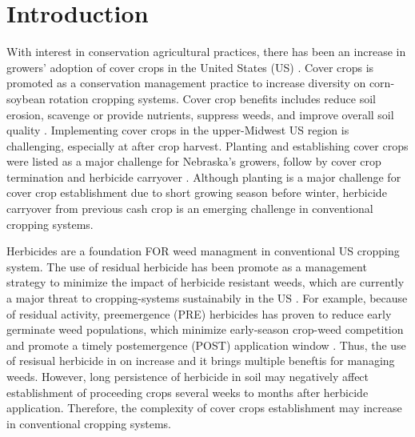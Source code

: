 \documentclass[agriculture,article,submit,moreauthors,pdftex]{mdpi}
\begin{document}

\hypertarget{introduction}{%
\section{Introduction}\label{introduction}}

With interest in conservation agricultural practices, there has been an
increase in growers' adoption of cover crops in the United States (US)
\citep{oliveira_assessment_2019}. Cover crops is promoted as a
conservation management practice to increase diversity on corn-soybean
rotation cropping systems. Cover crop benefits includes reduce soil
erosion, scavenge or provide nutrients, suppress weeds, and improve
overall soil quality
\citep{blanco-canqui_cover_2015, hartwig_cover_2002, snapp_evaluating_2005}.
Implementing cover crops in the upper-Midwest US region is challenging,
especially at after crop harvest. Planting and establishing cover crops
were listed as a major challenge for Nebraska's growers, follow by cover
crop termination and herbicide carryover
\citep{oliveira_assessment_2019}. Although planting is a major challenge
for cover crop establishment due to short growing season before winter,
herbicide carryover from previous cash crop is an emerging challenge in
conventional cropping systems.

Herbicides are a foundation FOR weed managment in conventional US
cropping system. The use of residual herbicide has been promote as a
management strategy to minimize the impact of herbicide resistant weeds,
which are currently a major threat to cropping-systems sustainabily in
the US \citep{norsworthy_reducing_2012}. For example, because of
residual activity, preemergence (PRE) herbicides has proven to reduce
early germinate weed populations, which minimize early-season crop-weed
competition and promote a timely postemergence (POST) application window
\citep{knezevic_critical_2019}. Thus, the use of resisual herbicide in
on increase and it brings multiple beneftis for managing weeds. However,
long persistence of herbicide in soil may negatively affect
establishment of proceeding crops several weeks to months after
herbicide application. Therefore, the complexity of cover crops
establishment may increase in conventional cropping systems.
\end{document}
